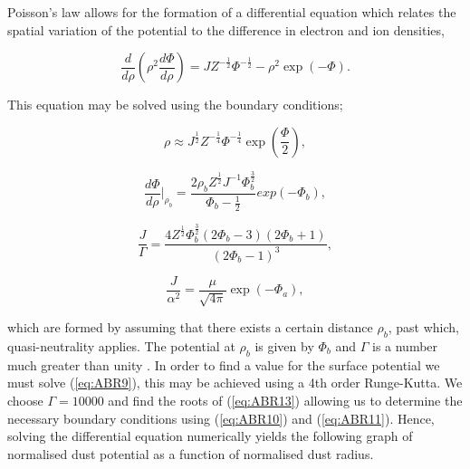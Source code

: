 \documentclass{article}
\begin{document}
Poisson's law allows for the formation of a differential equation which relates
the spatial variation of the potential to the difference in electron and 
ion densities,

\begin{equation}\label{eq:ABR9} 
\frac{d}{d\rho} \left(\rho^2 \frac{d\Phi}{d\rho}\right) = J Z^{-\frac{1}{2}}\Phi^{-\frac{1}{2}}  - \rho^2 \exp{(-\Phi)}.
\end{equation}

\smallskip

\noindent This equation may be solved using the boundary conditions;

\begin{equation}\label{eq:ABR10}
\rho \approx J^{\frac{1}{2}} Z^{-\frac{1}{4}} \Phi^{-\frac{1}{4}} \exp{\left(\frac{\Phi}{2}\right)},
\end{equation}
 
\begin{equation}\label{eq:ABR11}
\frac{d\Phi}{d\rho}\biggr|_{\rho_b} = \frac{2\rho_b Z^{\frac{1}{2}} J^{-1} \Phi_b^{\frac{3}{2}}}{\Phi_b - \frac{1}{2}} exp{(-\Phi_b)},
\end{equation}
 
\begin{equation}\label{eq:ABR13}
\frac{J}{\Gamma} = \frac{4Z^{\frac{1}{2}}\Phi_b^{\frac{3}{2}}(2\Phi_b - 3)(2\Phi_b + 1)}{(2\Phi_b - 1)^3},
\end{equation}

\begin{equation}\label{eq:ABR12}
\frac{J}{\alpha^2} = \frac{\mu}{\sqrt{4\pi}} \exp{\left(-\Phi_a\right)},
\end{equation}

\smallskip

\noindent which are formed by assuming that there exists a certain distance $\rho_b$, past which, quasi-neutrality applies. 
The potential at $\rho_b$ is given by $\Phi_b$ and $\Gamma$ is a number much greater than unity \cite{ABR}.
In order to find a value for the surface potential we must solve (\ref{eq:ABR9}), this may be 
achieved using a 4th order Runge-Kutta. We choose $\Gamma = 10000$ and find the roots of 
(\ref{eq:ABR13}) allowing us to determine the necessary boundary conditions 
using (\ref{eq:ABR10}) and (\ref{eq:ABR11}). Hence, solving the differential equation numerically yields 
the following graph of normalised dust potential as a function of normalised dust radius.
\end{document}
